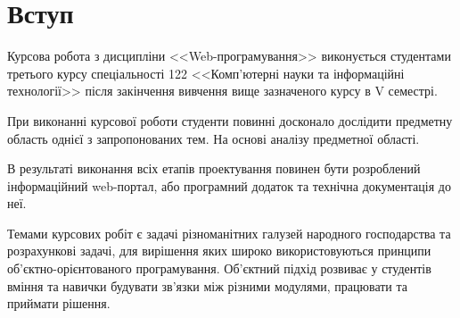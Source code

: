 \chapter{Вступ}
Курсова робота з дисципліни <<Web-програмування>> виконується студентами третього курсу спеціальності 122 <<Комп'ютерні науки та інформаційні технології>> після закінчення вивчення вище зазначеного курсу в V семестрі.

При виконанні курсової роботи студенти повинні досконало дослідити предметну область однієї з запропонованих тем. На основі аналізу предметної області.

В результаті виконання всіх етапів проектування повинен бути розроблений інформаційний web-портал, або програмний додаток та технічна документація до неї.

Темами курсових робіт є задачі різноманітних галузей народного господарства та розрахункові задачі, для вирішення яких широко використовуються принципи об'єктно-орієнтованого програмування. Об’єктний підхід розвиває у студентів вміння та навички будувати зв'язки між різними модулями, працювати та приймати рішення.



